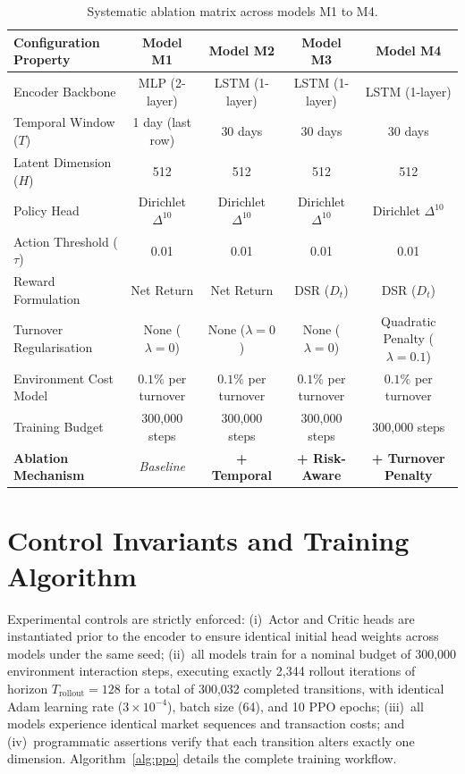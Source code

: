 \begin{table}[htbp]
\centering
\small
\setlength{\tabcolsep}{5pt}
\caption{Systematic ablation matrix across models M1 to M4.}
\label{tab:ablation_matrix}
\begin{tabular}{lcccc}
\toprule
\textbf{Configuration Property} & \textbf{Model M1} & \textbf{Model M2} & \textbf{Model M3} & \textbf{Model M4} \\
\midrule
Encoder Backbone & MLP (2-layer) & LSTM (1-layer) & LSTM (1-layer) & LSTM (1-layer) \\
Temporal Window ($T$) & 1 day (last row) & 30 days & 30 days & 30 days \\
Latent Dimension ($H$) & 512 & 512 & 512 & 512 \\
Policy Head & Dirichlet $\Delta^{10}$ & Dirichlet $\Delta^{10}$ & Dirichlet $\Delta^{10}$ & Dirichlet $\Delta^{10}$ \\
Action Threshold ($\tau$) & 0.01 & 0.01 & 0.01 & 0.01 \\
Reward Formulation & Net Return & Net Return & DSR ($D_t$) & DSR ($D_t$) \\
Turnover Regularisation & None ($\lambda = 0$) & None ($\lambda = 0$) & None ($\lambda = 0$) & Quadratic Penalty ($\lambda = 0.1$) \\
Environment Cost Model & $0.1\%$ per turnover & $0.1\%$ per turnover & $0.1\%$ per turnover & $0.1\%$ per turnover \\
Training Budget & 300,000 steps & 300,000 steps & 300,000 steps & 300,000 steps \\
\midrule
\textbf{Ablation Mechanism} & \textit{Baseline} & \textbf{+ Temporal} & \textbf{+ Risk-Aware} & \textbf{+ Turnover Penalty} \\
\bottomrule
\end{tabular}
\end{table}

\section{Control Invariants and Training Algorithm}
Experimental controls are strictly enforced: (i)~Actor and Critic heads are instantiated prior to the encoder to ensure identical initial head weights across models under the same seed; (ii)~all models train for a nominal budget of 300,000 environment interaction steps, executing exactly 2,344 rollout iterations of horizon $T_{\text{rollout}} = 128$ for a total of 300,032 completed transitions, with identical Adam learning rate ($3 \times 10^{-4}$), batch size (64), and 10 PPO epochs; (iii)~all models experience identical market sequences and transaction costs; and (iv)~programmatic assertions verify that each transition alters exactly one dimension. Algorithm~\ref{alg:ppo} details the complete training workflow.

